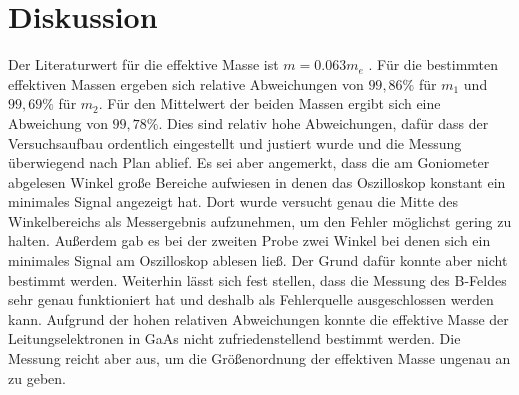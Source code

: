 \section{Diskussion}
\label{sec:Diskussion}
Der Literaturwert für die effektive Masse ist $m = 0.063m_e$ \cite{Masse}.
Für die bestimmten effektiven Massen ergeben sich relative Abweichungen von $99,86\%$ für $m_1$ und
$99,69\%$ für $m_2$. Für den Mittelwert der beiden Massen ergibt sich eine Abweichung von $99,78\%$.
Dies sind relativ hohe Abweichungen, dafür dass der Versuchsaufbau ordentlich eingestellt und justiert wurde und
die Messung überwiegend nach Plan ablief. Es sei aber angemerkt, dass die am Goniometer abgelesen Winkel
große Bereiche aufwiesen in denen das Oszilloskop konstant ein minimales Signal angezeigt hat. Dort wurde versucht
genau die Mitte des Winkelbereichs als Messergebnis aufzunehmen, um den Fehler möglichst gering zu halten.
Außerdem gab es bei der zweiten Probe zwei Winkel bei denen sich ein minimales Signal am Oszilloskop ablesen ließ.
Der Grund dafür konnte aber nicht bestimmt werden.
Weiterhin lässt sich fest stellen, dass die Messung des B-Feldes sehr genau funktioniert hat und deshalb als
Fehlerquelle ausgeschlossen werden kann. Aufgrund der hohen relativen Abweichungen konnte die effektive Masse
der Leitungselektronen in GaAs nicht zufriedenstellend bestimmt werden. Die Messung reicht aber aus, um
die Größenordnung der effektiven Masse ungenau an zu geben.
\newpage